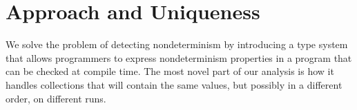 \section{Approach and Uniqueness\label{sec:approach}}

We solve the problem of detecting nondeterminism by introducing a type system
that allows programmers to express nondeterminism properties in a program that can be checked
at compile time.
The most novel part of our analysis is how it handles collections that will
contain the same values, but
possibly in a different order, on different runs.



